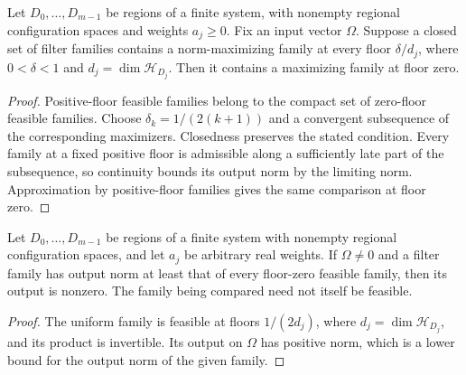 \begin{theorem}
    \label{thm:filter_zero_floor_closed_max}
    \leanok
    Let $D_0,\ldots,D_{m-1}$ be regions of a finite system, with
    nonempty regional configuration spaces and weights $a_j\ge0$.
    Fix an input vector $\Omega$. Suppose a closed set of filter families
    contains a norm-maximizing family at every floor $\delta/d_j$,
    where $0<\delta<1$ and $d_j=\dim\mathcal H_{D_j}$.
    Then it contains a maximizing family at floor zero.
\end{theorem}
\begin{proof}\leanok
    Positive-floor feasible families belong to the compact set of
    zero-floor feasible families. Choose $\delta_k=1/(2(k+1))$ and a
    convergent subsequence of the corresponding maximizers. Closedness
    preserves the stated condition. Every family at a fixed positive
    floor is admissible along a sufficiently late part of the subsequence,
    so continuity bounds its output norm by the limiting norm.
    Approximation by positive-floor families gives the same comparison
    at floor zero.
\end{proof}

\begin{lemma}
    \label{lem:filter_zero_floor_nonzero}
    \leanok
    Let $D_0,\ldots,D_{m-1}$ be regions of a finite system with nonempty
    regional configuration spaces, and let $a_j$ be arbitrary real weights.
    If $\Omega\ne0$ and a filter family has output norm at least that of
    every floor-zero feasible family, then its output is nonzero.
    The family being compared need not itself be feasible.
\end{lemma}
\begin{proof}\leanok
    The uniform family is feasible at floors $1/(2d_j)$, where
    $d_j=\dim\mathcal H_{D_j}$, and its product is invertible.
    Its output on $\Omega$ has positive norm, which is a lower bound
    for the output norm of the given family.
\end{proof}

